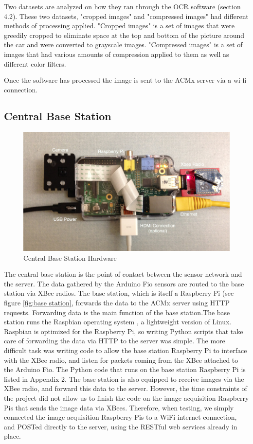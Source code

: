 \documentclass[11pt, oneside, fullpage, doublespace]{article}
\begin{document}
Two datasets are analyzed on how they ran through the OCR software (section 4.2). These two datasets, "cropped images" and "compressed images" had different methods of processing applied. "Cropped images" is a set of images that were greedily cropped to eliminate space at the top and bottom of the picture around the car and were converted to grayscale images. "Compressed images" is a set of images that had various amounts of compression applied to them as well as different color filters.

Once the software has processed the image is sent to the ACMx server via a wi-fi connection.

\subsection{Central Base Station}
\begin{figure}
\begin{center}
\includegraphics[width=4.5in]{basestation}
\end{center}
\caption{Central Base Station Hardware}
\label{fig:basestation}
\end{figure}

The central base station is the point of contact between the sensor network and the server. The data gathered by the Arduino Fio sensors are routed to the base station via XBee radios. The base station, which is itself a Raspberry Pi (see figure \ref{fig:base station}, forwards the data to the ACMx server using HTTP requests. Forwarding data is the main function of the base station.The base station runs the Raspbian operating system \cite{raspbian}, a lightweight version of Linux. Raspbian is optimized for the Raspberry Pi, so writing Python scripts that take care of forwarding the data via HTTP to the server was simple. The more difficult task was writing code to allow the base station Raspberry Pi to interface with the XBee radio, and listen for packets coming from the XBee attached to the Arduino Fio. The Python code that runs on the base station Raspberry Pi is listed in Appendix 2. The base station is also equipped to receive images via the XBee radio, and forward this data to the server. However, the time constraints of the project did not allow us to finish the code on the image acquisition Raspberry Pis that sends the image data via XBees. Therefore, when testing, we simply connected the image acquisition Raspberry Pis to a WiFi internet connection, and POSTed directly to the server, using the RESTful web services already in place.
\end{document}
